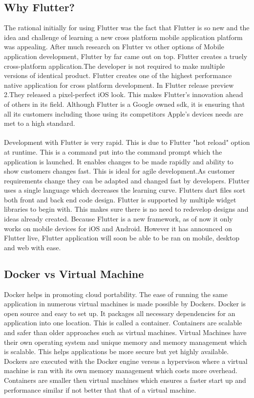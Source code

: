 \subsection{Why Flutter?}
The rational initially for using Flutter was the fact that Flutter is so new and the idea and challenge of learning a new cross platform mobile application platform was appealing. After much research on Flutter vs other options of Mobile application development, Flutter by far came out on top. Flutter creates a truely cross-platform application.The developer is not required to make multiple versions of identical product. Flutter creates one of the highest performance native application for cross platform development. In Flutter release preview 2.They released a pixel-perfect iOS look. This makes Flutter's innovation ahead of others in its field. Although Flutter is a Google owned sdk, it is ensuring that all its customers including those using its competitors Apple's devices needs are met to a high standard.
\paragraph{}Development with Flutter is very rapid. This is due to Flutter "hot reload" option at runtime. This is a command put into the command prompt which the application is launched. It enables changes to be made rapidly and ability to show customers changes fast. This is ideal for agile development.As customer requirements change they can be adapted and changed fast by developers. Flutter uses a single language which decreases the learning curve. Flutters dart files sort both front and back end code design. Flutter is supported by multiple widget libraries to begin with. This makes sure there is no need to redevelop designs and ideas already created. Because Flutter is a new framework, as of now it only works on mobile devices for iOS and Android. However it has announced on Flutter live, Flutter application will soon be able to be ran on mobile, desktop and web with ease.

\subsection{Docker vs Virtual Machine}
Docker helps in promoting cloud portability. The ease of running the same application in numerous virtual machines is made possible by Dockers. Docker is open source and easy to set up. It packages all necessary dependencies for an application into one location. This is called a container. Containers are scalable and safer than older approaches such as virtual machines. Virtual Machines have their own operating system and unique memory and memory management which is scalable.\cite{seshachala_2019} This helps applications be more secure but yet highly available. Dockers are executed with the Docker engine versus a hypervison where a virtual machine is ran with its own memory management which costs more overhead. Containers are smaller then virtual machines which ensures a faster start up and performance similar if not better that that of a virtual machine.\cite{bauer_bauer_2019}

